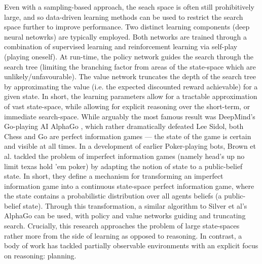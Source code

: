 \newline \newline
Even with a sampling-based approach, the seach space is often still prohibitively large, and so data-driven learning methods can be used to restrict the search space further to improve performance. Two distinct learning components (deep neural netowrks) are typically employed.  
\newline \newline 
Both networks are trained through a combination of supervised learning and reinforcement learning via self-play (playing oneself). At run-time, the policy network guides the search through the search tree (limiting the branching factor from areas of the state-space which are unlikely/unfavourable). The value network truncates the depth of the search tree by approximating the value (i.e. the expected discounted reward achievable) for a given state. In short, the learning parameters allow for a tractable approximation of vast state-space, while allowing for explicit reasoning over the short-term, or immediate search-space. 
\newline \newline
While arguably the most famous result was DeepMind's Go-playing AI AlphaGo \cite{AlphaGo}, which rather dramatically defeated Lee Sidol, both Chess and Go are perfect information games --- the state of the game is certain and visible at all times. In a development of earlier Poker-playing bots, Brown et al. \cite{Brown2020} tackled the problem of imperfect information games (namely head's up no limit texas hold 'em poker) by adapting the notion of state to a public-belief state. In short, they define a mechanism for transforming an imperfect information game into a continuous state-space perfect information game, where the state contains a probabilistic distribution over all agents beliefs (a public-belief state). Through this transformation, a similar algorithm to Silver et al's AlphaGo can be used, with policy and value networks guiding and truncating search.   
\newline \newline
Crucially, this research approaches the problem of large state-spaces rather more from the side of learning as opposed to reasoning. In contrast, a body of work has tackled partially observable environments with an explicit focus on reasoning: planning.  


